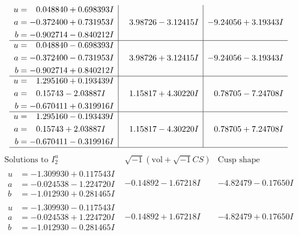 \documentclass[1p]{elsarticle_modified}
\theoremstyle{definition}
\newcommand{\I}{\sqrt{-1}}
\begin{document}
$$\begin{array}{c|c|c}
\begin{aligned}
u &= \phantom{-}0.048840 + 0.698393 I \\
a &= -0.372400 + 0.731953 I \\
b &= -0.902714 - 0.840212 I\end{aligned}
 & \phantom{-}3.98726 - 3.12415 I & -9.24056 + 3.19343 I \\ \hline\begin{aligned}
u &= \phantom{-}0.048840 - 0.698393 I \\
a &= -0.372400 - 0.731953 I \\
b &= -0.902714 + 0.840212 I\end{aligned}
 & \phantom{-}3.98726 + 3.12415 I & -9.24056 - 3.19343 I \\ \hline\begin{aligned}
u &= \phantom{-}1.295160 + 0.193439 I \\
a &= \phantom{-}0.15743 - 2.03887 I \\
b &= -0.670411 + 0.319916 I\end{aligned}
 & \phantom{-}1.15817 + 4.30220 I & \phantom{-}0.78705 - 7.24708 I \\ \hline\begin{aligned}
u &= \phantom{-}1.295160 - 0.193439 I \\
a &= \phantom{-}0.15743 + 2.03887 I \\
b &= -0.670411 - 0.319916 I\end{aligned}
 & \phantom{-}1.15817 - 4.30220 I & \phantom{-}0.78705 + 7.24708 I\\
 \hline 
 \end{array}$$\newpage$$\begin{array}{c|c|c}  
\text{Solutions to }I^u_{2}& \I (\text{vol} + \sqrt{-1}CS) & \text{Cusp shape}\\
 \hline 
\begin{aligned}
u &= -1.309930 + 0.117543 I \\
a &= -0.024538 - 1.224720 I \\
b &= -1.012930 + 0.281465 I\end{aligned}
 & -0.14892 - 1.67218 I & -4.82479 - 0.17650 I \\ \hline\begin{aligned}
u &= -1.309930 - 0.117543 I \\
a &= -0.024538 + 1.224720 I \\
b &= -1.012930 - 0.281465 I\end{aligned}
 & -0.14892 + 1.67218 I & -4.82479 + 0.17650 I \\ \hline\begin{aligned}

\end{aligned}
\end{array}$$
\end{document}
